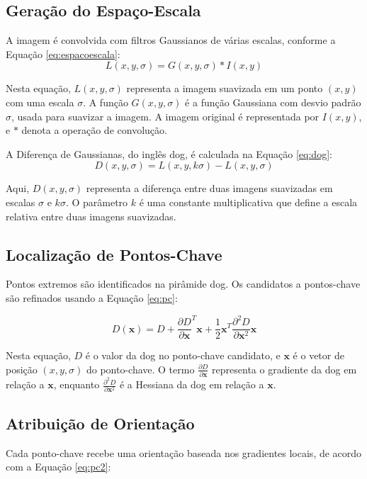 \subsection*{Geração do Espaço-Escala}
A imagem é convolvida com filtros Gaussianos de várias escalas, conforme a Equação \ref{eq:espacoescala}:
\begin{equation}
    L(x, y, \sigma) = G(x, y, \sigma) \ast I(x, y)
    \label{eq:espacoescala}
\end{equation}

Nesta equação, \(L(x, y, \sigma)\) representa a imagem suavizada em um ponto \((x, y)\) com uma escala \(\sigma\). A função \(G(x, y, \sigma)\) é a função Gaussiana com desvio padrão \(\sigma\), usada para suavizar a imagem. A imagem original é representada por \(I(x, y)\), e \(\ast\) denota a operação de convolução.

A Diferença de Gaussianas, do inglês \gls{dog}, é calculada na Equação \ref{eq:dog}:
\begin{equation}
    D(x, y, \sigma) = L(x, y, k\sigma) - L(x, y, \sigma)
    \label{eq:dog}
\end{equation}

Aqui, \(D(x, y, \sigma)\) representa a diferença entre duas imagens suavizadas em escalas \(\sigma\) e \(k\sigma\). O parâmetro \(k\) é uma constante multiplicativa que define a escala relativa entre duas imagens suavizadas.

\subsection*{Localização de Pontos-Chave}
Pontos extremos são identificados na pirâmide \gls{dog}. Os candidatos a pontos-chave são refinados usando a Equação \ref{eq:pc}:

\begin{equation}
    D(\mathbf{x}) = D + \frac{\partial D}{\partial \mathbf{x}}^T \mathbf{x} + \frac{1}{2} \mathbf{x}^T \frac{\partial^2 D}{\partial \mathbf{x}^2} \mathbf{x}
    \label{eq:pc}
\end{equation}


Nesta equação, \(D\) é o valor da \gls{dog} no ponto-chave candidato, e \(\mathbf{x}\) é o vetor de posição \((x, y, \sigma)\) do ponto-chave. O termo \(\frac{\partial D}{\partial \mathbf{x}}\) representa o gradiente da \gls{dog} em relação a \(\mathbf{x}\), enquanto \(\frac{\partial^2 D}{\partial \mathbf{x}^2}\) é a Hessiana da \gls{dog} em relação a \(\mathbf{x}\).

\subsection*{Atribuição de Orientação}
Cada ponto-chave recebe uma orientação baseada nos gradientes locais, de acordo com a Equação \ref{eq:pc2}:

